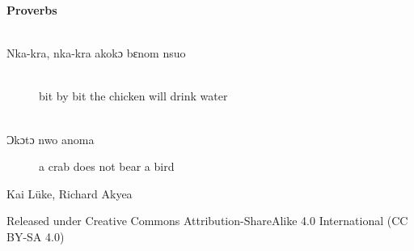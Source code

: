\documentclass[%
 fontsize=11pt,%
 a5paper,pagesize,
 paper=a5,%
 DIV=9,%
 parskip=half*,%
 twoside=true,
 pointlessnumbers
]{scrbook}%
\begin{document}
\newpage{}
\thispagestyle {empty}

\vspace*{2cm}

\begin{center}
	\parbox{10cm}{
		\begin{raggedright}
		{ 
		  \Large{\textbf{Proverbs}} \\
		  
		  ~
		  
		  \normalsize
			\begin{description}
        \item[Nka-kra, nka-kra akokɔ bɛnom nsuo] ~ \\
          bit by bit the chicken will drink water \\
          ~
        \item[Ɔkɔtɔ nwo anoma] a crab does not bear a bird
      \end{description}
		}
		\end{raggedright}
	}

\end{center}

\vspace*{5cm}

\begin{center}

\scriptsize Kai Lüke, Richard Akyea

\tiny Released under Creative Commons Attribution-ShareAlike 4.0 International (CC BY-SA 4.0)
\end{center}

\begin{comment}
Just some notes, not visible in pdf.
\end{comment}

\newpage{}
\thispagestyle {empty}

~
\end{document}

